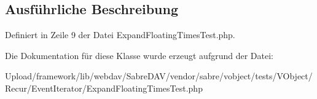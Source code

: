 \subsection{Ausführliche Beschreibung}


Definiert in Zeile 9 der Datei Expand\+Floating\+Times\+Test.\+php.



Die Dokumentation für diese Klasse wurde erzeugt aufgrund der Datei\+:\begin{DoxyCompactItemize}
\item 
Upload/framework/lib/webdav/\+Sabre\+D\+A\+V/vendor/sabre/vobject/tests/\+V\+Object/\+Recur/\+Event\+Iterator/Expand\+Floating\+Times\+Test.\+php\end{DoxyCompactItemize}
